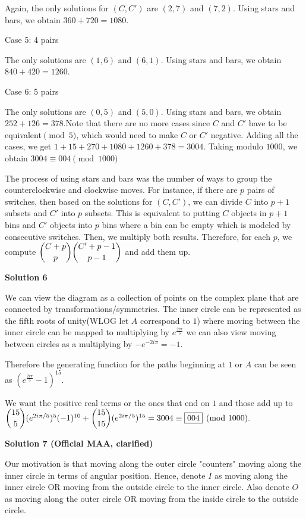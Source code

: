 \begin{enumerate}
 Again, the only solutions for $(C,C')$ are $(2,7)$ and $(7,2)$. Using stars and bars, we obtain $360+720=1080$.

 Case 5: 4 pairs

 The only solutions are $(1,6)$ and $(6,1)$. Using stars and bars, we obtain $840+420=1260$.

 Case 6: 5 pairs

 The only solutions are $(0,5)$ and $(5,0)$. Using stars and bars, we obtain $252+126=378$.Note that there are no more cases since $C$ and $C'$ have to be equivalent$\pmod{5}$, which would need to make $C$ or $C'$ negative. Adding all the cases, we get $1+15+270+1080+1260+378=3004$. Taking modulo $1000$, we obtain $3004 \equiv \boxed{004} \pmod{1000}$

 
The process of using stars and bars was the number of ways to group the counterclockwise and clockwise moves. For instance, if there are $p$ pairs of switches, then based on the solutions for $(C,C')$, we can divide $C$ into $p+1$ subsets and $C'$ into $p$ subsets. This is equivalent to putting $C$ objects in $p+1$ bins and $C'$ objects into $p$ bins where a bin can be empty which is modeled by consecutive switches. Then, we multiply both results. Therefore, for each $p$, we compute $\dbinom{C+p}{p}\dbinom{C'+p-1}{p-1}$ and add them up.

 



\textbf{Solution 6}

We can view the diagram as a collection of points on the complex plane that are connected by transformations/symmetries. The inner circle can be represented as the fifth roots of unity(WLOG let $A$ correspond to $1$) where moving between the inner circle can be mapped to multiplying by $e^{\frac{2i\pi}{5}}$ we can also view moving between circles as a multiplying by $-e^{-2i\pi} = -1.$ 

 Therefore the generating function for the paths beginning at $1$ or $A$ can be seen as $(e^{\frac{2i\pi}{5}} - 1)^{15}.$

 We want the positive real terms or the ones that end on $1$ and those add up to $\dbinom{15}{5}(e^{2i\pi/5})^5(-1)^{10} + \dbinom{15}{15}(e^{2i\pi/5})^{15} = 3004 \equiv \boxed{004} \pmod{1000}.$




\textbf{Solution 7 (Official MAA, clarified)}

Our motivation is that moving along the outer circle "counters" moving along the inner circle in terms of angular position. Hence, denote $I$ as moving along the inner circle OR moving from the outside circle to the inner circle. Also denote $O$ as moving along the outer circle OR moving from the inside circle to the outside circle.


\end{enumerate}
